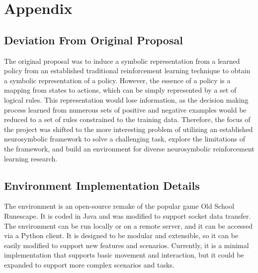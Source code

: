 \documentclass{article}
\begin{document}


\appendix

\section{Appendix}
\subsection{Deviation From Original Proposal}

The original proposal was to induce a symbolic representation from a learned policy from an established traditional reinforcement learning technique to obtain a symbolic representation of a policy. However, the essence of a policy is a mapping from states to actions, which can be simply represented by a set of logical rules. This representation would lose information, as the decision making process learned from numerous sets of positive and negative examples would be reduced to a set of rules constrained to the training data. Therefore, the focus of the project was shifted to the more interesting problem of utilizing an established neurosymbolic framework to solve a challenging task, explore the limitations of the framework, and build an environment for diverse neurosymbolic reinforcement learning research.

\subsection{Environment Implementation Details}

The environment is an open-source remake of the popular game Old School Runescape. It is coded in Java and was modified to support socket data transfer. The environment can be run locally or on a remote server, and it can be accessed via a Python client. It is designed to be modular and extensible, so it can be easily modified to support new features and scenarios. Currently, it is a minimal implementation that supports basic movement and interaction, but it could be expanded to support more complex scenarios and tasks.
\end{document}
